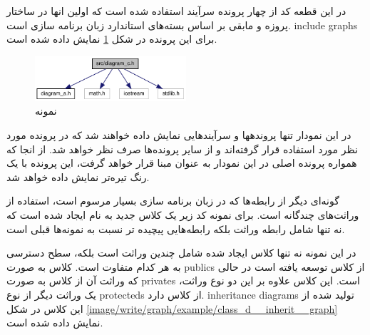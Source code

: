 
در این قطعه کد از چهار پرونده سرآیند استفاده شده است که اولین انها در ساختار
پروزه و مابقی بر اساس بسته‌های استاندارد زبان برنامه سازی  است.
\glspl{include graph} برای این پرونده در شکل
\ref{image/write/graph/example/diagram__c_8h__incl} نمایش داده شده است.

\begin{figure}
	\centering
	\includegraphics[width=0.5\textwidth]{image/write/graph/example/diagram__c_8h__incl}
	\caption[نمونه]{
		نمونه
	}
	\label{image/write/graph/example/diagram__c_8h__incl}
\end{figure}

در این نمودار تنها پروندهها و سرآیندهایی نمایش داده خواهند شد که در پرونده مورد
نظر مورد استفاده قرار گرفته‌اند و از سایر پرونده‌ها صرف نظر خواهد شد. از انجا که
همواره پرونده اصلی در این نمودار به عنوان مبنا قرار خواهد گرفت، این پرونده با یک
رنگ تیره‌تر نمایش داده خواهد شد.

گونه‌ای دیگر از رابطه‌ها که در زبان برنامه سازی  بسیار مرسوم است،
استفاده از وراثت‌های چندگانه است. برای نمونه کد زیر یک کلاس جدید به نام 
ایجاد شده است که نه تنها شامل رابطه وراثت بلکه رابطه‌هایی پیچیده تر نسبت به
نمونه‌ها قبلی است.


در این نمونه نه تنها کلاس ایجاد شده شامل چندین وراثت است بلکه، سطح دسترسی به هر
کدام متفاوت است. کلاس  به صورت \glspl{public} از کلاس  توسعه
یافته است در حالی که وراثت آن از کلاس  به صورت \glspl{private} است. این
کلاس علاوه بر این دو نوع وراثت، یک وراثت دیگر از نوع \glspl{protected} از کلاس
 دارد. \glspl{inheritance diagram} تولید شده از این کلاس در شکل
\ref{image/write/graph/example/class_d__inherit__graph} نمایش داده شده است.

